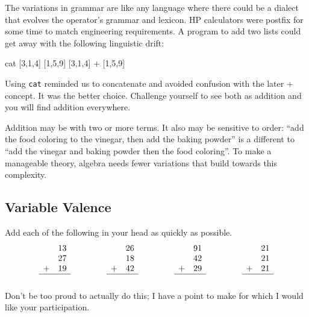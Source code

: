 The variations in grammar are like any language 
where there could be a dialect that evolves the operator's grammar and lexicon.
 HP calculators were postfix for some time to match engineering requirements.
A program to add two lists could get away with the following linguistic drift:
\begin{center}
\begin{notebookin}
cat [3,1,4] [1,5,9]
[3,1,4] + [1,5,9]
\end{notebookin}
\begin{notebookout}[2]
[3,1,4,1,5,9]
[4,6,13]
\end{notebookout}
\end{center}
Using \texttt{cat} reminded us to concatenate and avoided confusion with the
later $+$ concept.  It was the better choice. Challenge yourself to see both as
addition and you will find addition everywhere. 

Addition  may be with two or more terms.  It also may be 
sensitive to order: ``add the food coloring to the vinegar, then add the baking
powder'' is a different to ``add the vinegar and baking powder then the
food coloring''.  To make a manageable theory, algebra needs fewer variations that 
build towards this complexity.

\subsection{Variable Valence}
Add each of the following in your head as quickly as possible.
\begin{equation*}
\begin{array}{cc}
    & 13\\
    & 27\\
   + & 19\\
\hline\\
\end{array}
\hspace{1.5cm}
\begin{array}{cc}
    & 26\\
    & 18\\
  + & 42\\
\hline\\
\end{array}
\hspace{1.5cm}
\begin{array}{cc}
    & 91\\
    & 42\\
  + & 29\\
\hline\\
\end{array}
\hspace{1.5cm}
\begin{array}{cc}
    & 21\\
    & 21\\
  + & 21\\
\hline\\
\end{array}
\end{equation*}
Don't be too proud to actually do this; I have a point to make for which 
I would like your participation.  

